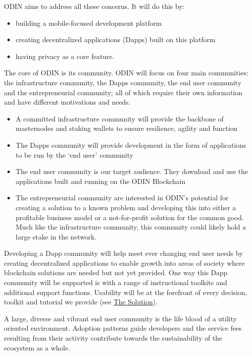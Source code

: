 \documentclass[12pt,letterpaper]{article}
\begin{document}
ODIN aims to address all these concerns. It will do this by:
\begin{itemize}
   \item building a mobile-focused development platform 
   \item creating decentralized applications (Dapps) built on this platform
   \item having privacy as a core feature.
\end{itemize}

The core of ODIN is its community. ODIN will focus on four main communities: the infrastructure community, the Dapps community, the end user community and the entrepreneurial community; all of which require their own information and have different motivations and needs.
\begin{itemize}
\item A committed infrastructure community will provide the backbone of masternodes and staking wallets to ensure resilience, agility and function
\item The Dapps community will provide development in the form of applications to be run by the `end user' community
\item The end user community is our target audience. They download and use the applications built and running on the ODIN Blockchain
\item The entrepreneurial community are interested in ODIN's potential for creating a solution to a known problem and developing this into either a profitable business model or a not-for-profit solution for the common good. Much like the infrastructure community, this community could likely hold a large stake in the network.
\end{itemize}

Developing a Dapp community will help meet ever changing end user needs by creating decentralized applications to enable growth into areas of society where blockchain solutions are needed but not yet provided. One way this Dapp community will be supported is with a range of instructional toolkits and additional support functions. Usability will be at the forefront of every decision, toolkit and tutorial we provide (see \hyperlink{solution}{The Solution}).

A large, diverse and vibrant end user community is the life blood of a utility oriented environment. Adoption patterns guide developers and the service fees resulting from their activity contribute towards the sustainability of the ecosystem as a whole.
\end{document}
